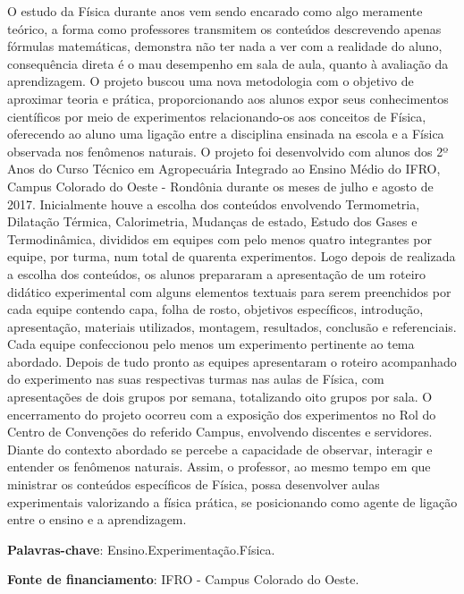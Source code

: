 \documentclass[article,12pt,onesidea,4paper,english,brazil]{abntex2}
\begin{document}
	\noindent O estudo da Física durante anos vem sendo encarado como algo meramente
	teórico, a forma como professores transmitem os conteúdos descrevendo apenas
	fórmulas matemáticas, demonstra não ter nada a ver com a realidade do aluno,
	consequência direta é o mau desempenho em sala de aula, quanto à avaliação da
	aprendizagem. O projeto buscou uma nova metodologia com o objetivo de aproximar
	teoria e prática, proporcionando aos alunos expor seus conhecimentos científicos
	por meio de experimentos relacionando-os aos conceitos de Física, oferecendo ao
	aluno uma ligação entre a disciplina ensinada na escola e a Física observada nos
	fenômenos naturais. O projeto foi desenvolvido com alunos dos 2º Anos do Curso
	Técnico em Agropecuária Integrado ao Ensino Médio do IFRO, Campus Colorado do
	Oeste - Rondônia durante os meses de julho e agosto de 2017. Inicialmente houve a
	escolha dos conteúdos envolvendo Termometria, Dilatação Térmica, Calorimetria,
	Mudanças de estado, Estudo dos Gases e Termodinâmica, divididos em equipes
	com pelo menos quatro integrantes por equipe, por turma, num total de quarenta
	experimentos. Logo depois de realizada a escolha dos conteúdos, os alunos
	prepararam a apresentação de um roteiro didático experimental com alguns
	elementos textuais para serem preenchidos por cada equipe contendo capa, folha
	de rosto, objetivos específicos, introdução, apresentação, materiais utilizados,
	montagem, resultados, conclusão e referenciais. Cada equipe confeccionou pelo
	menos um experimento pertinente ao tema abordado. Depois de tudo pronto as
	equipes apresentaram o roteiro acompanhado do experimento nas suas respectivas
	turmas nas aulas de Física, com apresentações de dois grupos por semana,
	totalizando oito grupos por sala. O encerramento do projeto ocorreu com a
	exposição dos experimentos no Rol do Centro de Convenções do referido Campus,
	envolvendo discentes e servidores. Diante do contexto abordado se percebe a
	capacidade de observar, interagir e entender os fenômenos naturais. Assim, o
	professor, ao mesmo tempo em que ministrar os conteúdos específicos de Física,
	possa desenvolver aulas experimentais valorizando a física prática, se posicionando
	como agente de ligação entre o ensino e a aprendizagem.
	
	\vspace{\onelineskip}
	
	\noindent
	\textbf{Palavras-chave}: Ensino.Experimentação.Física.
	
	\vspace{\onelineskip}
	
	\noindent
	\textbf{Fonte de financiamento}: IFRO - Campus Colorado do Oeste.
	
\end{document}
